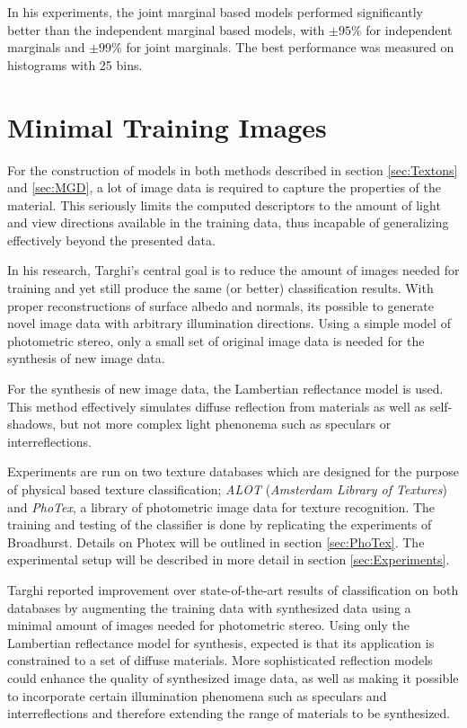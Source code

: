In his experiments, the joint marginal based models performed significantly better than the independent marginal based models, with $\pm 95\%$ for independent marginals and $\pm 99\%$ for joint marginals. The best performance was measured on histograms with 25 bins. 

\section{Minimal Training Images}\label{sec:Minimal}

For the construction of models in both methods described in section \ref{sec:Textons} and \ref{sec:MGD}, a lot of image data is required to capture the properties of the material. This seriously limits the computed descriptors to the amount of light and view directions available in the training data, thus incapable of generalizing effectively beyond the presented data.

In his research, Targhi's central goal is to reduce the amount of images needed for training and yet still produce the same (or better) classification results. With proper reconstructions of surface albedo and normals, its possible to generate novel image data with arbitrary illumination directions. Using a simple model of photometric stereo, only a small set of original image data is needed for the synthesis of new image data.

For the synthesis of new image data, the Lambertian reflectance model is used. This method effectively simulates diffuse reflection from materials as well as self-shadows, but not more complex light phenonema such as speculars or interreflections. 

Experiments are run on two texture databases which are designed for the purpose of physical based texture classification; \textit{ALOT} (\textit{Amsterdam Library of Textures}) and \textit{PhoTex}, a library of photometric image data for texture recognition. The training and testing of the classifier is done by replicating the experiments of Broadhurst. Details on Photex will be outlined in section \ref{sec:PhoTex}. The experimental setup will be described in more detail in section \ref{sec:Experiments}.

Targhi reported improvement over state-of-the-art results of classification on both databases by augmenting the training data with synthesized data using a minimal amount of images needed for photometric stereo. Using only the Lambertian reflectance model for synthesis, expected is that its application is constrained to a set of diffuse materials. More sophisticated reflection models could enhance the quality of synthesized image data, as well as making it possible to incorporate certain illumination phenomena such as speculars and interreflections and therefore extending the range of materials to be synthesized.

